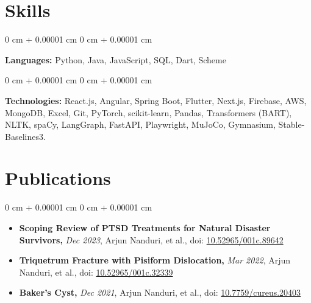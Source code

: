 \documentclass[10pt, letterpaper]{article}
\newenvironment{highlights}{
    \begin{itemize}[
        topsep=0.3 cm,
        parsep=0.05 cm,
        partopsep=0pt,
        itemsep=0pt,
        leftmargin=0 cm + 10pt
    ]
}{
    \end{itemize}
} %
\newenvironment{onecolentry}{
    \begin{adjustwidth}{
        0 cm + 0.00001 cm
    }{
        0 cm + 0.00001 cm
    }
}{
    \end{adjustwidth}
} %
\begin{document}
    \section{Skills}

        \begin{onecolentry}
            \textbf{Languages:} Python, Java, JavaScript, SQL, Dart, Scheme
        \end{onecolentry}

        \vspace{0.07 cm}

        \begin{onecolentry}
            \textbf{Technologies:} React.js, Angular, Spring Boot, Flutter, Next.js, Firebase, AWS, MongoDB, Excel, Git, PyTorch, scikit-learn, Pandas, Transformers (BART), NLTK, spaCy, LangGraph, FastAPI, Playwright, MuJoCo, Gymnasium, Stable-Baselines3.
        \end{onecolentry}

    \section{Publications}

        \begin{onecolentry}
            \begin{highlights}
                \item \textbf{Scoping Review of PTSD Treatments for Natural Disaster Survivors,} \textit{Dec 2023}, Arjun Nanduri, et al., doi: \href{https://doi.org/10.52965/001c.89642}{10.52965/001c.89642}
                \item \textbf{Triquetrum Fracture with Pisiform Dislocation,} \textit{Mar 2022}, Arjun Nanduri, et al., doi: \href{https://doi.org/10.52965/001c.32339}{10.52965/001c.32339}
                \item \textbf{Baker's Cyst,} \textit{Dec 2021}, Arjun Nanduri, et al., doi: \href{https://doi.org/10.7759/cureus.20403}{10.7759/cureus.20403}
            \end{highlights}
        \end{onecolentry}
\end{document}
